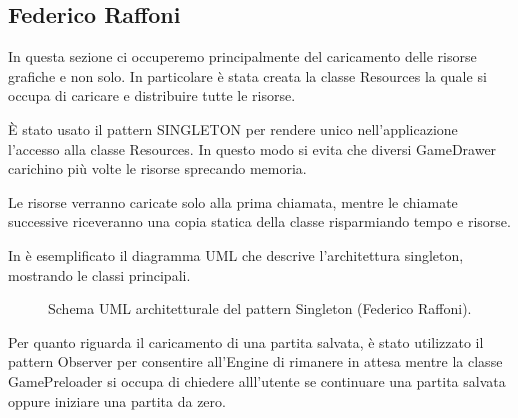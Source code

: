 \documentclass[a4paper,12pt]{report}
\begin{document}
\subsection{Federico Raffoni}
In questa sezione ci occuperemo principalmente del caricamento delle risorse grafiche e non solo. In particolare è stata creata la classe Resources la quale si occupa di caricare e distribuire tutte le risorse. 

È stato usato il pattern SINGLETON per rendere unico nell’applicazione l’accesso alla classe Resources. In questo modo si evita che diversi GameDrawer carichino più volte le risorse sprecando memoria.

 Le risorse verranno caricate solo alla prima chiamata, mentre le chiamate successive riceveranno una copia statica della classe risparmiando tempo e risorse.
 
 In  è esemplificato il diagramma UML che descrive l'architettura singleton, mostrando le classi principali.
\hfill\break

\begin{figure}[!htb]
	\caption{Schema UML architetturale del pattern Singleton (Federico Raffoni).}
	\label{img:FedericoRaffoni_Singleton}
\end{figure}

Per quanto riguarda il caricamento di una partita salvata, è stato utilizzato il pattern Observer per consentire all’Engine di rimanere in attesa mentre la classe GamePreloader si occupa di chiedere alll’utente se continuare una partita salvata oppure iniziare una partita da zero.
\end{document}
